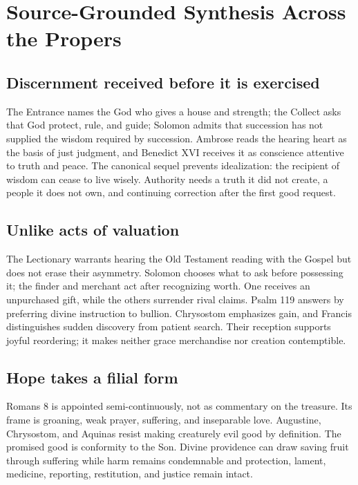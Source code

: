 \section*{Source-Grounded Synthesis Across the Propers}

\subsection*{Discernment received before it is exercised}

The Entrance names the God who gives a house and strength; the Collect asks
that God protect, rule, and guide; Solomon admits that succession has not
supplied the wisdom required by succession. Ambrose reads the hearing heart as
the basis of just judgment, and Benedict XVI receives it as conscience
attentive to truth and peace. The canonical sequel prevents idealization: the
recipient of wisdom can cease to live wisely. Authority needs a truth it did
not create, a people it does not own, and continuing correction after the
first good request.

\subsection*{Unlike acts of valuation}

The Lectionary warrants hearing the Old Testament reading with the Gospel but
does not erase their asymmetry. Solomon chooses what to ask before possessing
it; the finder and merchant act after recognizing worth. One receives an
unpurchased gift, while the others surrender rival claims. Psalm 119 answers
by preferring divine instruction to bullion. Chrysostom emphasizes gain, and
Francis distinguishes sudden discovery from patient search. Their reception
supports joyful reordering; it makes neither grace merchandise nor creation
contemptible.

\subsection*{Hope takes a filial form}

Romans 8 is appointed semi-continuously, not as commentary on the treasure.
Its frame is groaning, weak prayer, suffering, and inseparable love. Augustine,
Chrysostom, and Aquinas resist making creaturely evil good by definition. The
promised good is conformity to the Son. Divine providence can draw saving
fruit through suffering while harm remains condemnable and protection, lament,
medicine, reporting, restitution, and justice remain intact.

